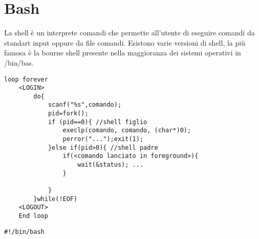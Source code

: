 \documentclass{article}
\begin{document}
\pagebreak
\section{Bash}
La shell è un interprete comandi che permette all'utente di eseguire comandi da standart input oppure da file comandi.
Esistono varie versioni di shell, la più famosa è la bourne shell presente nella maggioranza dei sistemi operativi in /bin/bas.
\begin{lstlisting}[style=CStyle]
    loop forever
    <LOGIN>
        do{
            scanf("%s",comando);
            pid=fork();
            if (pid==0){ //shell figlio
                execlp(comando, comando, (char*)0);
                perror("...");exit(1);
            }else if(pid>0){ //shell padre
                if(<comando lanciato in foreground>){
                    wait(&status); ...
                }

            }
        }while(!EOF)
    <LOGOUT>
    End loop 
\end{lstlisting}


\begin{lstlisting}[style=BashStyle]
    #!/bin/bash

    
    
\end{lstlisting}
\end{document}
